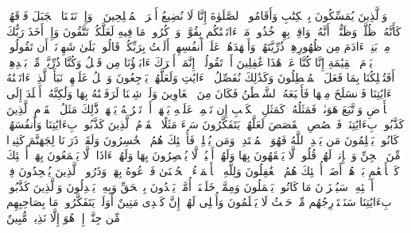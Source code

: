 \stopbuffer%
\startbuffer[\q:7:170]
وَٱلَّذِینَ یُمَسِّكُونَ بِٱلۡكِتَٰبِ وَأَقَامُوا۟ ٱلصَّلَوٰةَ إِنَّا لَا نُضِیعُ أَجۡرَ ٱلۡمُصۡلِحِینَ%
\stopbuffer%
\startbuffer[\q:7:171]
۞ وَإِذۡ نَتَقۡنَا ٱلۡجَبَلَ فَوۡقَهُمۡ كَأَنَّهُۥ ظُلَّةࣱ وَظَنُّوۤا۟ أَنَّهُۥ وَاقِعُۢ بِهِمۡ خُذُوا۟ مَاۤ ءَاتَیۡنَٰكُم بِقُوَّةࣲ وَٱذۡكُرُوا۟ مَا فِیهِ لَعَلَّكُمۡ تَتَّقُونَ%
\stopbuffer%
\startbuffer[\q:7:172]
وَإِذۡ أَخَذَ رَبُّكَ مِنۢ بَنِیۤ ءَادَمَ مِن ظُهُورِهِمۡ ذُرِّیَّتَهُمۡ وَأَشۡهَدَهُمۡ عَلَىٰۤ أَنفُسِهِمۡ أَلَسۡتُ بِرَبِّكُمۡۖ قَالُوا۟ بَلَىٰ شَهِدۡنَاۤۚ أَن تَقُولُوا۟ یَوۡمَ ٱلۡقِیَٰمَةِ إِنَّا كُنَّا عَنۡ هَٰذَا غَٰفِلِینَ%
\stopbuffer%
\startbuffer[\q:7:173]
أَوۡ تَقُولُوۤا۟ إِنَّمَاۤ أَشۡرَكَ ءَابَاۤؤُنَا مِن قَبۡلُ وَكُنَّا ذُرِّیَّةࣰ مِّنۢ بَعۡدِهِمۡۖ أَفَتُهۡلِكُنَا بِمَا فَعَلَ ٱلۡمُبۡطِلُونَ%
\stopbuffer%
\startbuffer[\q:7:174]
وَكَذَٰلِكَ نُفَصِّلُ ٱلۡءَایَٰتِ وَلَعَلَّهُمۡ یَرۡجِعُونَ%
\stopbuffer%
\startbuffer[\q:7:175]
وَٱتۡلُ عَلَیۡهِمۡ نَبَأَ ٱلَّذِیۤ ءَاتَیۡنَٰهُ ءَایَٰتِنَا فَٱنسَلَخَ مِنۡهَا فَأَتۡبَعَهُ ٱلشَّیۡطَٰنُ فَكَانَ مِنَ ٱلۡغَاوِینَ%
\stopbuffer%
\startbuffer[\q:7:176]
وَلَوۡ شِئۡنَا لَرَفَعۡنَٰهُ بِهَا وَلَٰكِنَّهُۥۤ أَخۡلَدَ إِلَى ٱلۡأَرۡضِ وَٱتَّبَعَ هَوَىٰهُۚ فَمَثَلُهُۥ كَمَثَلِ ٱلۡكَلۡبِ إِن تَحۡمِلۡ عَلَیۡهِ یَلۡهَثۡ أَوۡ تَتۡرُكۡهُ یَلۡهَثۚ ذَّٰلِكَ مَثَلُ ٱلۡقَوۡمِ ٱلَّذِینَ كَذَّبُوا۟ بِءَایَٰتِنَاۚ فَٱقۡصُصِ ٱلۡقَصَصَ لَعَلَّهُمۡ یَتَفَكَّرُونَ%
\stopbuffer%
\startbuffer[\q:7:177]
سَاۤءَ مَثَلًا ٱلۡقَوۡمُ ٱلَّذِینَ كَذَّبُوا۟ بِءَایَٰتِنَا وَأَنفُسَهُمۡ كَانُوا۟ یَظۡلِمُونَ%
\stopbuffer%
\startbuffer[\q:7:178]
مَن یَهۡدِ ٱللَّهُ فَهُوَ ٱلۡمُهۡتَدِیۖ وَمَن یُضۡلِلۡ فَأُو۟لَٰۤئِكَ هُمُ ٱلۡخَٰسِرُونَ%
\stopbuffer%
\startbuffer[\q:7:179]
وَلَقَدۡ ذَرَأۡنَا لِجَهَنَّمَ كَثِیرࣰا مِّنَ ٱلۡجِنِّ وَٱلۡإِنسِۖ لَهُمۡ قُلُوبࣱ لَّا یَفۡقَهُونَ بِهَا وَلَهُمۡ أَعۡیُنࣱ لَّا یُبۡصِرُونَ بِهَا وَلَهُمۡ ءَاذَانࣱ لَّا یَسۡمَعُونَ بِهَاۤۚ أُو۟لَٰۤئِكَ كَٱلۡأَنۡعَٰمِ بَلۡ هُمۡ أَضَلُّۚ أُو۟لَٰۤئِكَ هُمُ ٱلۡغَٰفِلُونَ%
\stopbuffer%
\startbuffer[\q:7:180]
وَلِلَّهِ ٱلۡأَسۡمَاۤءُ ٱلۡحُسۡنَىٰ فَٱدۡعُوهُ بِهَاۖ وَذَرُوا۟ ٱلَّذِینَ یُلۡحِدُونَ فِیۤ أَسۡمَٰۤئِهِۦۚ سَیُجۡزَوۡنَ مَا كَانُوا۟ یَعۡمَلُونَ%
\stopbuffer%
\startbuffer[\q:7:181]
وَمِمَّنۡ خَلَقۡنَاۤ أُمَّةࣱ یَهۡدُونَ بِٱلۡحَقِّ وَبِهِۦ یَعۡدِلُونَ%
\stopbuffer%
\startbuffer[\q:7:182]
وَٱلَّذِینَ كَذَّبُوا۟ بِءَایَٰتِنَا سَنَسۡتَدۡرِجُهُم مِّنۡ حَیۡثُ لَا یَعۡلَمُونَ%
\stopbuffer%
\startbuffer[\q:7:183]
وَأُمۡلِی لَهُمۡۚ إِنَّ كَیۡدِی مَتِینٌ%
\stopbuffer%
\startbuffer[\q:7:184]
أَوَلَمۡ یَتَفَكَّرُوا۟ۗ مَا بِصَاحِبِهِم مِّن جِنَّةٍۚ إِنۡ هُوَ إِلَّا نَذِیرࣱ مُّبِینٌ%
\stopbuffer%
\startbuffer[\q:7:185]
